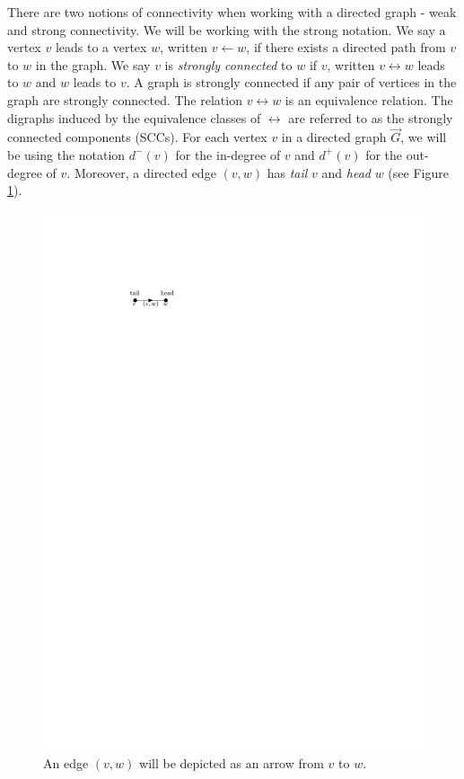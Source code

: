 There are two notions of connectivity when working with a directed graph - weak and strong connectivity. We will be working with the strong notation. We say a vertex $v$ leads to a vertex $w$, written $v \leftarrow w$, if there exists a directed path from $v$ to $w$ in the graph. We say $v$ is \emph{strongly connected} to $w$ if $v$, written $v \leftrightarrow w$ leads to $w$ and $w$ leads to $v$. A graph is strongly connected if any pair of vertices in the graph are strongly connected. The relation $v \leftrightarrow w$ is an equivalence relation. The digraphs induced by the equivalence classes of $\leftrightarrow$ are referred to as the strongly connected components (SCCs). For each vertex $v$ in a directed graph $\vec{G}$, we will be using the notation $d^-(v)$ for the in-degree of $v$ and $d^+(v)$ for the out-degree of $v$. Moreover, a directed edge $(v,w)$ has \emph{tail} $v$ and \emph{head} $w$ (see Figure \ref{fig.tailhead}).
\begin{figure}
    \centering
    \includegraphics{Content/Pictures/tail-head.pdf}
    \caption{An edge $(v,w)$ will be depicted as an arrow from $v$ to $w$.}\label{fig.tailhead}
\end{figure}


